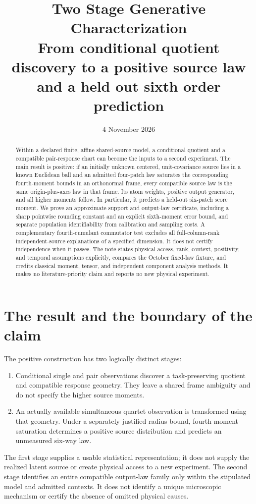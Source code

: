 \documentclass[11pt]{article}
\title{Two Stage Generative Characterization\\[5pt]
\large From conditional quotient discovery to a positive source law\\
and a held out sixth order prediction}
\author{}
\date{4 November 2026}
\theoremstyle{definition}
\theoremstyle{remark}
\begin{document}
\maketitle

\begin{abstract}
Within a declared finite, affine shared-source model, a conditional quotient
and a compatible pair-response chart can become the inputs to a second
experiment. The main result is positive: if an initially unknown centered,
unit-covariance source lies in a known Euclidean ball and an admitted
four-patch law saturates the corresponding fourth-moment bounds in an
orthonormal frame, every compatible source law is the same origin-plus-axes
law in that frame. Its atom weights, positive output generator, and all
higher moments follow. In particular, it predicts a held-out six-patch
score moment. We prove an approximate support and output-law certificate,
including a sharp pointwise rounding constant and an explicit sixth-moment
error bound, and separate population identifiability from calibration and
sampling costs. A complementary fourth-cumulant commutator test excludes
all full-column-rank independent-source explanations of a specified
dimension. It does not certify independence when it passes. The note
states physical access, rank, context, positivity, and temporal assumptions
explicitly, compares the October fixed-law fixture, and credits classical
moment, tensor, and independent component analysis methods. It makes no
literature-priority claim and reports no new physical experiment.
\end{abstract}

\tableofcontents

\section{The result and the boundary of the claim}
\label{sec:scope}

The positive construction has two logically distinct stages:
\begin{enumerate}
\item Conditional single and pair observations discover a task-preserving
quotient and compatible response geometry. They leave a shared frame
ambiguity and do not specify the higher source moments.
\item An actually available simultaneous quartet observation is transformed
using that geometry. Under a separately justified radius bound, fourth
moment saturation determines a positive source distribution and predicts
an unmeasured six-way law.
\end{enumerate}
The first stage supplies a usable statistical representation; it does not
supply the realized latent source or create physical access to a new
experiment. The second stage identifies an entire compatible output-law
family only within the stipulated model and admitted contexts. It does not
identify a unique microscopic mechanism or certify the absence of omitted
physical causes.
\end{document}

